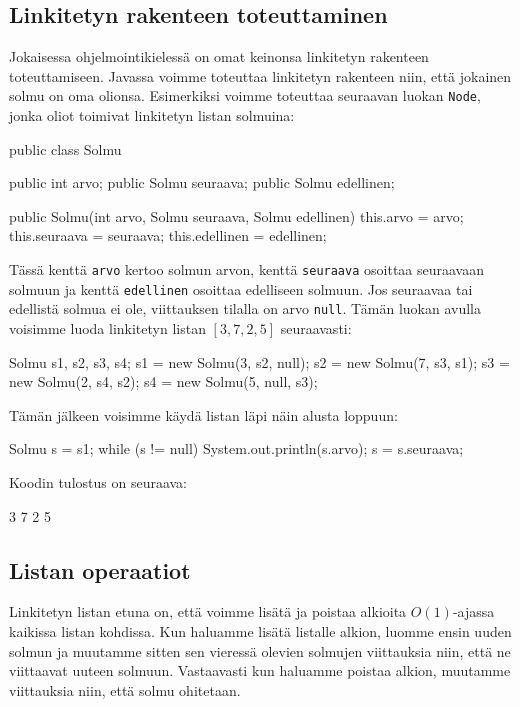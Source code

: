 \subsection{Linkitetyn rakenteen toteuttaminen}

Jokaisessa ohjelmointikielessä on omat keinonsa
linkitetyn rakenteen toteuttamiseen.
Javassa voimme toteuttaa linkitetyn rakenteen niin,
että jokainen solmu on oma olionsa.
Esimerkiksi voimme toteuttaa seuraavan luokan \texttt{Node},
jonka oliot toimivat linkitetyn listan solmuina:

\begin{code}
public class Solmu {
    public int arvo;
    public Solmu seuraava;
    public Solmu edellinen;

    public Solmu(int arvo, Solmu seuraava, Solmu edellinen) {
        this.arvo = arvo;
        this.seuraava = seuraava;
        this.edellinen = edellinen;
    }
}
\end{code}

Tässä kenttä \texttt{arvo} kertoo solmun arvon,
kenttä \texttt{seuraava} osoittaa seuraavaan solmuun
ja kenttä \texttt{edellinen} osoittaa edelliseen solmuun.
Jos seuraavaa tai edellistä solmua ei ole,
viittauksen tilalla on arvo \texttt{null}.
Tämän luokan avulla voisimme luoda linkitetyn listan $[3,7,2,5]$
seuraavasti:

\begin{code}
Solmu s1, s2, s3, s4;
s1 = new Solmu(3, s2, null);
s2 = new Solmu(7, s3, s1);
s3 = new Solmu(2, s4, s2);
s4 = new Solmu(5, null, s3);
\end{code}

Tämän jälkeen voisimme käydä listan läpi näin alusta loppuun:

\begin{code}
Solmu s = s1;
while (s != null) {
    System.out.println(s.arvo);
    s = s.seuraava;
}
\end{code}

Koodin tulostus on seuraava:

\begin{code}
3
7
2
5
\end{code}

\subsection{Listan operaatiot}

Linkitetyn listan etuna on,
että voimme lisätä ja poistaa
alkioita $O(1)$-ajassa kaikissa listan kohdissa.
Kun haluamme lisätä listalle alkion,
luomme ensin uuden solmun ja muutamme sitten
sen vieressä olevien solmujen viittauksia niin,
että ne viittaavat uuteen solmuun.
Vastaavasti kun haluamme poistaa alkion,
muutamme viittauksia niin, että solmu ohitetaan.

